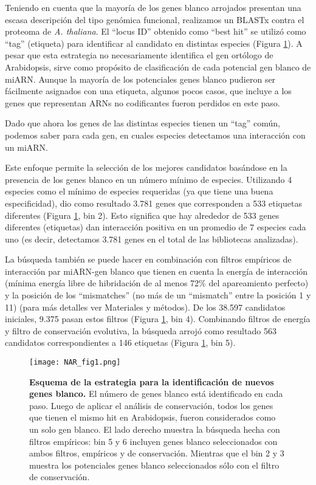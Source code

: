Teniendo en cuenta que la mayoría de los genes blanco arrojados presentan una escasa descripción del tipo genómica funcional, realizamos un BLASTx  contra el proteoma de \textit{A. thaliana}.
El ``locus ID'' obtenido como ``best hit'' se utilizó como ``tag'' (etiqueta) para identificar al candidato en distintas especies (Figura \ref{fig:NAR_fig1}).
A pesar que esta estrategia no necesariamente identifica el gen ortólogo de Arabidopsis, sirve como propósito de clasificación de cada potencial gen blanco de miARN.
Aunque la mayoría de los potenciales genes blanco pudieron ser fácilmente asignados con una etiqueta, algunos pocos casos, que incluye a los genes que representan ARNs no codificantes fueron perdidos en este paso.

Dado que ahora los genes de las distintas especies tienen un ``tag'' común, podemos saber para cada gen, en cuales especies detectamos una interacción con un miARN.

Este enfoque permite la selección de los mejores candidatos basándose en la presencia de los genes blanco en un número mínimo de especies.
Utilizando 4 especies como el mínimo de especies requeridas (ya que tiene una buena especificidad), dio como resultado 3.781 genes que corresponden a 533 etiquetas diferentes (Figura \ref{fig:NAR_fig1}, bin 2).
Esto significa que hay alrededor de 533 genes diferentes (etiquetas) dan interacción positiva en un promedio de 7 especies cada uno (es decir, detectamos 3.781 genes en el total de las bibliotecas analizadas).

La búsqueda también se puede hacer en combinación con filtros empíricos de interacción par miARN-gen blanco que tienen en cuenta la energía de interacción (mínima energía libre de hibridación de al menos 72\% del apareamiento perfecto) y la posición de los ``mismatches'' (no más de un ``mismatch'' entre la posición 1 y 11) (para más detalles ver Materiales y métodos).
De los 38.597 candidatos iniciales, 9.375 pasan estos filtros (Figura \ref{fig:NAR_fig1}, bin 4).
Combinando filtros de energía y filtro de conservación evolutiva, la búsqueda arrojó como resultado 563 candidatos correspondientes a 146 etiquetas (Figura \ref{fig:NAR_fig1}, bin 5).


\begin{figure}[htbp!] 
    \centering    
    \texttt{[image: NAR\_fig1.png]}
    \caption[Estrategia]{
    \textbf{Esquema de la estrategia para la identificación de nuevos genes blanco.}
    El número de genes blanco está identificado en cada paso. 
    Luego de aplicar el análisis de conservación, todos los genes que tienen el mismo hit en Arabidopsis, fueron considerados como un solo gen blanco. 
    El lado derecho muestra la búsqueda hecha con filtros empíricos: bin 5 y 6 incluyen genes blanco seleccionados con ambos filtros, empíricos y de conservación.
    Mientras que el bin 2 y 3 muestra los potenciales genes blanco seleccionados sólo con el filtro de conservación.}
    \label{fig:NAR_fig1}
\end{figure}

